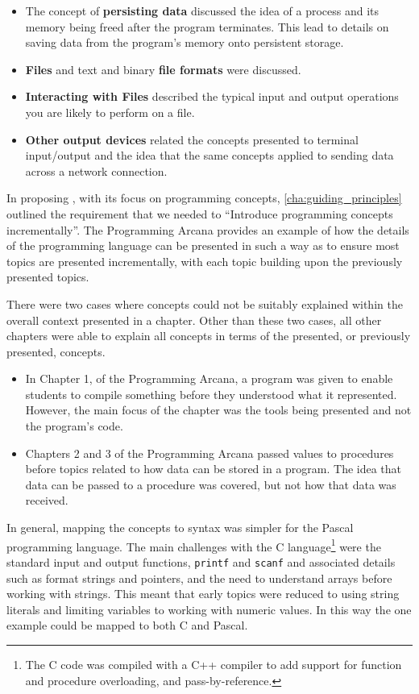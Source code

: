 \begin{enumerate}
  \begin{itemize}[noitemsep,nolistsep]
    \item The concept of \textbf{persisting data} discussed the idea of a process and its memory being freed after the program terminates. This lead to details on saving data from the program's memory onto persistent storage.
    \item \textbf{Files} and text and binary \textbf{file formats} were discussed. 
    \item \textbf{Interacting with Files} described the typical input and output operations you are likely to perform on a file.
    \item \textbf{Other output devices} related the concepts presented to terminal input/output and the idea that the same concepts applied to sending data across a network connection.
  \end{itemize}
\end{enumerate}

In proposing , with its focus on programming concepts, \cref{cha:guiding_principles} outlined the requirement that we needed to ``Introduce programming concepts incrementally''. The Programming Arcana provides an example of how the details of the programming language can be presented in such a way as to ensure most topics are presented incrementally, with each topic building upon the previously presented topics. 

There were two cases where concepts could not be suitably explained within the overall context presented in a chapter. Other than these two cases, all other chapters were able to explain all concepts in terms of the presented, or previously presented, concepts.
\begin{itemize}[noitemsep,nolistsep]
  \item In Chapter 1, of the Programming Arcana, a program was given to enable students to compile something before they understood what it represented. However, the main focus of the chapter was the tools being presented and not the program's code. 
  \item Chapters 2 and 3 of the Programming Arcana passed values to procedures before topics related to how data can be stored in a program. The idea that data can be passed to a procedure was covered, but not how that data was received.
\end{itemize}

In general, mapping the concepts to syntax was simpler for the Pascal programming language. The main challenges with the C language\footnote{The C code was compiled with a C++ compiler to add support for function and procedure overloading, and pass-by-reference.} were the standard input and output functions, \texttt{printf} and \texttt{scanf} and associated details such as format strings and pointers, and the need to understand arrays before working with strings. This meant that early topics were reduced to using string literals and limiting variables to working with numeric values. In this way the one example could be mapped to both C and Pascal. 

